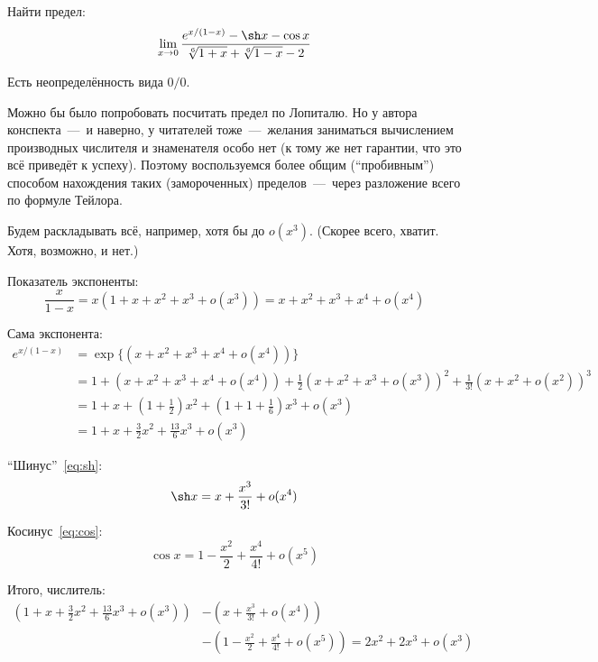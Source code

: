 \documentclass[a4paper,12pt]{article}
\begin{document}
  Найти предел:
  \[
    \lim_{x \to 0} \frac{e^{x / (1 - x)} - \sh x - \cos x}{\sqrt[6]{1 + x} + \sqrt[6]{1 - x} - 2}
  \]
  
  \begin{solution}
    Есть неопределённость вида $0/0$.

    Можно бы было попробовать посчитать предел по Лопиталю.
    Но у автора конспекта~---~и наверно, у читателей тоже~---~желания заниматься вычислением производных числителя и знаменателя особо нет (к тому же нет гарантии, что это всё приведёт к успеху).
    Поэтому воспользуемся более общим (``пробивным'') способом нахождения таких (замороченных) пределов~---~через разложение всего по формуле Тейлора.

    Будем раскладывать всё, например, хотя бы до $o(x^3)$.
    (Скорее всего, хватит.
    Хотя, возможно, и нет.)

    Показатель экспоненты:
    \[
      \frac{x}{1 - x} = x (1 + x + x^2 + x^3 + o(x^3)) = x + x^2 + x^3 + x^4 + o(x^4)
    \]

    Сама экспонента:
    \begin{equation*}
    \begin{split}
      e^{x / (1 - x)} &= \exp\{(x + x^2 + x^3 + x^4 + o(x^4))\}\\
        &= 1 + (x + x^2 + x^3 + x^4 + o(x^4)) + \frac{1}{2}(x + x^2 + x^3 + o(x^3))^2 + \frac{1}{3!}(x + x^2 + o(x^2))^3\\
        &= 1 + x + \left(1 + \frac{1}{2}\right) x^2 + \left(1 + 1 + \frac{1}{6}\right) x^3 + o(x^3)\\
        &= 1 + x + \frac{3}{2} x^2 + \frac{13}{6} x^3 + o(x^3)
    \end{split}
    \end{equation*}

    ``Шинус''~\eqref{eq:sh}:
    \[
      \sh x = x + \frac{x^3}{3!} + o(x^4)
    \]

    Косинус~\eqref{eq:cos}:
    \[
      \cos x = 1 - \frac{x^2}{2} + \frac{x^4}{4!} + o(x^5)
    \]

    Итого, числитель:
    \begin{equation*}
    \begin{split}
      \left(1 + x + \frac{3}{2} x^2 + \frac{13}{6} x^3 + o(x^3)\right) &- \left(x + \frac{x^3}{3!} + o(x^4)\right)\\
      &- \left(1 - \frac{x^2}{2} + \frac{x^4}{4!} + o(x^5)\right)
      = 2x^2 + 2x^3 + o(x^3)
    \end{split}
    \end{equation*}


\end{solution}
\end{document}

